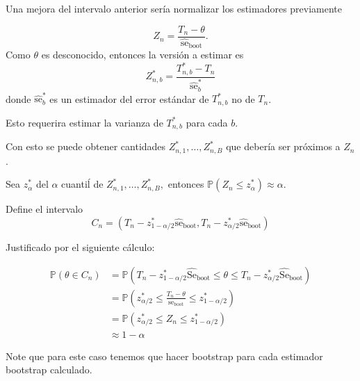 \documentclass[12pt]{book}\usepackage[]{graphicx}\usepackage[]{color}
\theoremstyle{definition}
\theoremstyle{plain}
\begin{document}
Una mejora del intervalo anterior sería normalizar los estimadores previamente

\[
Z_{n}=\frac{T_{n}-\theta}{\widehat{\mathrm{se}}_{\mathrm{boot}}}.
\]
Como \(\theta\) es desconocido, entonces la versión a estimar es
\[
Z_{n, b}^{*}=\frac{T_{n, b}^{*}-T_{n}}{\widehat{\mathrm{se}}_{b}^{*}}
\]
donde  \(\widehat{\mathrm{se}}_{b}^{*}\) es un estimador del error estándar de  \(T_{n, b}^{*}\) no de \(T_{n}\).

\begin{cuidado}{}{}
    Esto requerira estimar la varianza de \(T_{n,b}^*\) para cada \(b\).
\end{cuidado}

Con esto se puede obtener  cantidades \(Z_{n, 1}^{*}, \ldots, Z_{n, B}^{*}\) que debería ser próximos a \(Z_{n}\).

Sea \(z_{\alpha}^{*}\) del \(\alpha\) cuantiĺ de \(Z_{n, 1}^{*}, \ldots, Z_{n, B}^{*},\) entonces  \(\mathbb{P}\left(Z_{n} \leq z_{\alpha}^{*}\right) \approx \alpha\).

Define el intervalo
\begin{equation*}
C_{n}=\left(T_{n}-z_{1-\alpha / 2}^{*} \widehat{\mathrm{se}}_{\mathrm{boot}}, T_{n}-z_{\alpha / 2}^{*} \widehat{\mathrm{se}}_{\mathrm{boot}}\right)
\end{equation*}

Justificado por el siguiente cálculo:


\begin{align*}
\mathbb{P}\left(\theta \in C_{n}\right) &=\mathbb{P}\left(T_{n}-z_{1-\alpha / 2}^{*} \widehat{\mathrm{Se}}_{\mathrm{boot}} \leq \theta \leq T_{n}-z_{\alpha / 2}^{*} \widehat{\mathrm{Se}}_{\mathrm{boot}}\right) \\
&=\mathbb{P}\left(z_{\alpha / 2}^{*} \leq \frac{T_{n}-\theta}{\mathrm{se}_{\mathrm{boot}}} \leq z_{1-\alpha / 2}^{*}\right) \\
&=\mathbb{P}\left(z_{\alpha / 2}^{*} \leq Z_{n} \leq z_{1-\alpha / 2}^{*}\right) \\
& \approx 1-\alpha
\end{align*}

\begin{laboratorio}{}{}

    Note que para este caso tenemos que hacer bootstrap para cada estimador bootstrap calculado.



\end{laboratorio}
\end{document}
